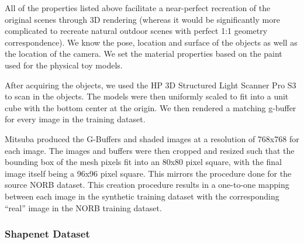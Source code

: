 \documentclass[10pt,twocolumn,letterpaper]{article}
\begin{document}
 All of the properties listed above facilitate a near-perfect recreation of the original scenes through 3D rendering (whereas it would be significantly more complicated to recreate natural outdoor scenes with perfect 1:1 geometry correspondence). We know the pose, location and surface of the objects as well as the location of the camera. We set the material properties based on the paint used for the physical toy models.
 
After acquiring the objects, we used the HP 3D Structured Light Scanner Pro S3\cite{HPSCANNER} to scan in the objects. The models were then uniformly scaled to fit into a unit cube with the bottom center at the origin. We then rendered a matching g-buffer for every image in the training dataset.  

Mitsuba produced the G-Buffers and shaded images at a resolution of 768x768 for each image.  The images and buffers were then cropped and resized such that the bounding box of the mesh pixels fit into an 80x80 pixel square, with the final image itself being a 96x96 pixel square. This mirrors the procedure done for the source NORB dataset. This creation procedure results in a one-to-one mapping between each image in the synthetic training dataset with the corresponding ``real'' image in the NORB training dataset.


\subsubsection{Shapenet Dataset}
\end{document}

